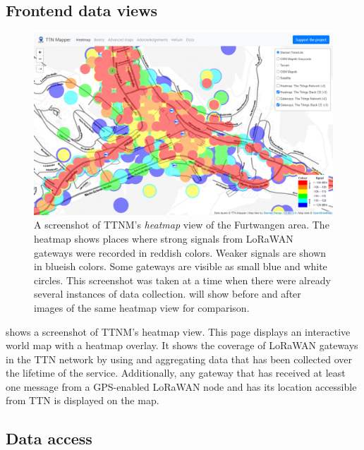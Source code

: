 \subsection{Frontend data views}

\begin{figure}[htbp]
    \centering
    \includegraphics[width=1\textwidth]{pictures/ttn-mapper/heatmap_with_gateways.png}
    \caption{
        A screenshot of \ac{TTNM}'s \emph{heatmap} view of the Furtwangen area.
        The heatmap shows places where strong signals from \ac{LoRaWAN} gateways were recorded in reddish colors.
        Weaker signals are shown in blueish colors.
        Some gateways are visible as small blue and white circles.
        This screenshot was taken at a time when there were already several instances of data collection.
         will show before and after images of the same heatmap view for comparison.~\protect\cite{ttn_mapper_ttn_2023}
    }\label{pic:ttn-mapper-heatmap-with-gateways}
\end{figure}

 shows a screenshot of \acl{TTNM}'s heatmap view.
This page displays an interactive world map with a heatmap overlay.
It shows the coverage of \ac{LoRaWAN} gateways in the \ac{TTN} network by using and aggregating data that has been collected over the lifetime of the service.
Additionally, any gateway that has received at least one message from a \ac{GPS}-enabled \ac{LoRaWAN} node and has its location accessible from \ac{TTN} is displayed on the map.

\subsection{Data access}

